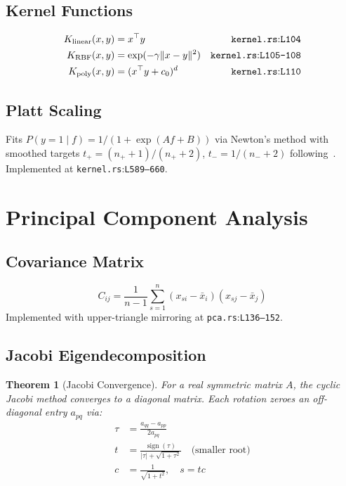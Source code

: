 \documentclass[11pt,a4paper]{article}
\newtheorem{theorem}{Theorem}[section]
\theoremstyle{remark}
\newcommand{\coderef}[2]{\texttt{#1}:\texttt{L#2}}
\newcommand{\sign}{\operatorname{sign}}
\begin{document}
\subsection{Kernel Functions}

\begin{align}
  K_{\text{linear}}(x, y) &= x^\top y & \text{\coderef{kernel.rs}{104}} \\
  K_{\text{RBF}}(x, y) &= \exp(-\gamma \|x - y\|^2) & \text{\coderef{kernel.rs}{105--108}} \\
  K_{\text{poly}}(x, y) &= (x^\top y + c_0)^d & \text{\coderef{kernel.rs}{110}}
\end{align}

\subsection{Platt Scaling}

Fits $P(y{=}1 \mid f) = 1/(1 + \exp(Af + B))$ via Newton's method with
smoothed targets $t_+ = (n_+ + 1)/(n_+ + 2)$, $t_- = 1/(n_- + 2)$
following~\cite{platt2000}.  Implemented at \coderef{kernel.rs}{589--660}. \checkmark

\section{Principal Component Analysis}
\label{sec:pca}

\subsection{Covariance Matrix}

\begin{equation}
  C_{ij} = \frac{1}{n-1}\sum_{s=1}^{n}(x_{si} - \bar{x}_i)(x_{sj} - \bar{x}_j)
  \label{eq:cov}
\end{equation}
Implemented with upper-triangle mirroring at \coderef{pca.rs}{136--152}. \checkmark

\subsection{Jacobi Eigendecomposition}

\begin{theorem}[Jacobi Convergence]
\label{thm:jacobi}
For a real symmetric matrix $A$, the cyclic Jacobi method converges to a
diagonal matrix.  Each rotation zeroes an off-diagonal entry $a_{pq}$ via:
\begin{align}
  \tau &= \frac{a_{qq} - a_{pp}}{2a_{pq}} \label{eq:tau}\\
  t &= \frac{\sign(\tau)}{|\tau| + \sqrt{1 + \tau^2}}
    \quad \text{(smaller root)} \label{eq:t}\\
  c &= \frac{1}{\sqrt{1 + t^2}}, \quad s = tc \label{eq:cs}
\end{align}
\end{theorem}
\end{document}
